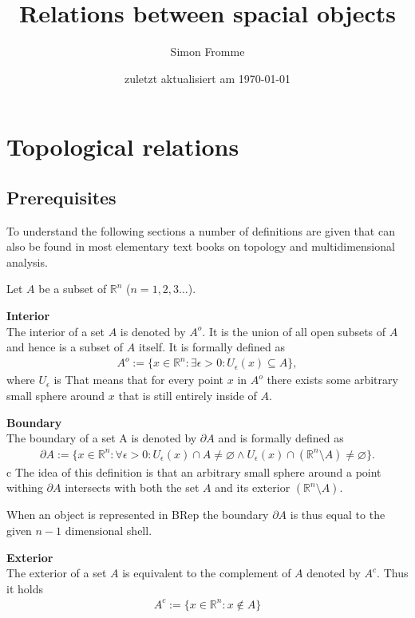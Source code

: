 \documentclass[paper=a4, fontsize=11pt]{scrartcl} %
\title{Relations between spacial objects}
\author{Simon Fromme}
\date{\normalsize zuletzt aktualisiert am \today}
\numberwithin{equation}{section} %
\numberwithin{figure}{section} %
\numberwithin{table}{section} %
\begin{document}
\maketitle
\newpage




\section{Topological relations}
\subsection{Prerequisites}

To understand the following sections a number of definitions are given that can also be found in most elementary text books on topology and multidimensional analysis.

Let $A$ be a subset of $\mathbb{R}^n$ ($n=1,2,3\dots$).

\textbf{Interior}\\
The interior of a set $A$ is denoted by $A^o$. It is the union of all open subsets of $A$ and hence is a subset of $A$ itself. It is formally defined as
\begin{align*}
  A^o := \{ x\in \mathbb{R}^n : \exists \epsilon > 0 : U_{\epsilon}(x) \subseteq A \},
\end{align*}
where $U_{\epsilon}$ is 
That means that for every point $x$ in $A^o$ there exists some arbitrary small sphere around $x$ that is still entirely inside of $A$. 

\textbf{Boundary} \\
The boundary of a set A is denoted by $\partial A$ and is formally defined as
\begin{align*}
  \partial A := \{ x \in \mathbb{R}^n : \forall \epsilon > 0 : U_{\epsilon}(x) \cap A \ne \varnothing \wedge U_{\epsilon}(x) \cap (\mathbb{R}^n \setminus A) \ne \varnothing    \}.
\end{align*}c
The idea of this definition is that an arbitrary small sphere around a point withing $\partial A$ intersects with both the set $A$ and its exterior $(\mathbb{R}^n \setminus A)$.

When an object is represented in BRep the boundary $\partial A$ is thus equal to the given $n-1$ dimensional shell.  

\textbf{Exterior} \\
The exterior of a set $A$ is equivalent to the complement of $A$ denoted by $A^c$. Thus it holds
\begin{align*}
  A^c:=\{x\in \mathbb{R}^n:x\notin A\}
\end{align*}
\end{document}
